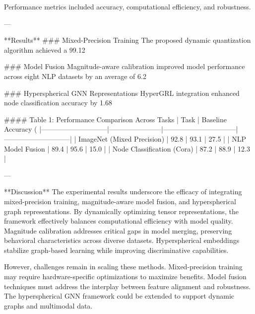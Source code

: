 Performance metrics included accuracy, computational efficiency, and robustness.  

---

**Results**  
### Mixed-Precision Training  
The proposed dynamic quantization algorithm achieved a 99.12%

### Model Fusion  
Magnitude-aware calibration improved model performance across eight NLP datasets by an average of 6.2%

### Hyperspherical GNN Representations  
HyperGRL integration enhanced node classification accuracy by 1.68%

#### Table 1: Performance Comparison Across Tasks  
| Task                        | Baseline Accuracy (%
|-----------------------------|-----------------------|--------------------------------|-----------------------------|  
| ImageNet (Mixed Precision)  | 92.8                 | 93.1                           | 27.5                        |  
| NLP Model Fusion            | 89.4                 | 95.6                           | 15.0                        |  
| Node Classification (Cora)  | 87.2                 | 88.9                           | 12.3                        |  

---

**Discussion**  
The experimental results underscore the efficacy of integrating mixed-precision training, magnitude-aware model fusion, and hyperspherical graph representations. By dynamically optimizing tensor representations, the framework effectively balances computational efficiency with model quality. Magnitude calibration addresses critical gaps in model merging, preserving behavioral characteristics across diverse datasets. Hyperspherical embeddings stabilize graph-based learning while improving discriminative capabilities.  

However, challenges remain in scaling these methods. Mixed-precision training may require hardware-specific optimizations to maximize benefits. Model fusion techniques must address the interplay between feature alignment and robustness. The hyperspherical GNN framework could be extended to support dynamic graphs and multimodal data.  

